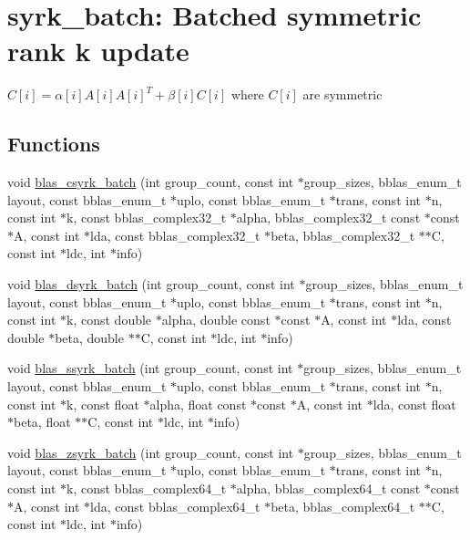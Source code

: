 \hypertarget{group__syrk__batch}{}\section{syrk\+\_\+batch\+: Batched symmetric rank k update}
\label{group__syrk__batch}


$ C[i] = \alpha[i] A[i] A[i]^T + \beta[i] C[i] $ where $ C[i] $ are symmetric  


\subsection*{Functions}
\begin{DoxyCompactItemize}
\item 
void \hyperlink{group__syrk__batch_ga94e86ba1afc5a916a21c81c36b69d7b8}{blas\+\_\+csyrk\+\_\+batch} (int group\+\_\+count, const int $\ast$group\+\_\+sizes, bblas\+\_\+enum\+\_\+t layout, const bblas\+\_\+enum\+\_\+t $\ast$uplo, const bblas\+\_\+enum\+\_\+t $\ast$trans, const int $\ast$n, const int $\ast$k, const bblas\+\_\+complex32\+\_\+t $\ast$alpha, bblas\+\_\+complex32\+\_\+t const $\ast$const $\ast$A, const int $\ast$lda, const bblas\+\_\+complex32\+\_\+t $\ast$beta, bblas\+\_\+complex32\+\_\+t $\ast$$\ast$C, const int $\ast$ldc, int $\ast$info)
\item 
void \hyperlink{group__syrk__batch_gad68fb19e3fc8cc2d118be659cecae1a5}{blas\+\_\+dsyrk\+\_\+batch} (int group\+\_\+count, const int $\ast$group\+\_\+sizes, bblas\+\_\+enum\+\_\+t layout, const bblas\+\_\+enum\+\_\+t $\ast$uplo, const bblas\+\_\+enum\+\_\+t $\ast$trans, const int $\ast$n, const int $\ast$k, const double $\ast$alpha, double const $\ast$const $\ast$A, const int $\ast$lda, const double $\ast$beta, double $\ast$$\ast$C, const int $\ast$ldc, int $\ast$info)
\item 
void \hyperlink{group__syrk__batch_ga67e4827aa5b548bf5d43cc254c363819}{blas\+\_\+ssyrk\+\_\+batch} (int group\+\_\+count, const int $\ast$group\+\_\+sizes, bblas\+\_\+enum\+\_\+t layout, const bblas\+\_\+enum\+\_\+t $\ast$uplo, const bblas\+\_\+enum\+\_\+t $\ast$trans, const int $\ast$n, const int $\ast$k, const float $\ast$alpha, float const $\ast$const $\ast$A, const int $\ast$lda, const float $\ast$beta, float $\ast$$\ast$C, const int $\ast$ldc, int $\ast$info)
\item 
void \hyperlink{group__syrk__batch_gab46bf316b01f4a7d1c8eeedcaed8a65e}{blas\+\_\+zsyrk\+\_\+batch} (int group\+\_\+count, const int $\ast$group\+\_\+sizes, bblas\+\_\+enum\+\_\+t layout, const bblas\+\_\+enum\+\_\+t $\ast$uplo, const bblas\+\_\+enum\+\_\+t $\ast$trans, const int $\ast$n, const int $\ast$k, const bblas\+\_\+complex64\+\_\+t $\ast$alpha, bblas\+\_\+complex64\+\_\+t const $\ast$const $\ast$A, const int $\ast$lda, const bblas\+\_\+complex64\+\_\+t $\ast$beta, bblas\+\_\+complex64\+\_\+t $\ast$$\ast$C, const int $\ast$ldc, int $\ast$info)
\end{DoxyCompactItemize}



